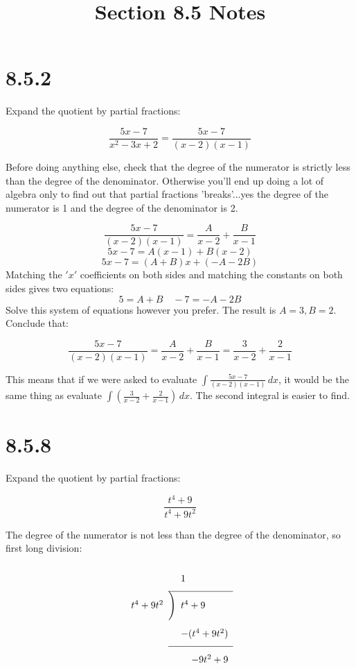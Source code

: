 \documentclass[11pt]{article}
\title{Section 8.5 Notes}
\begin{document}
\maketitle

\section*{8.5.2}

Expand the quotient by partial fractions:

$$\frac{5x-7}{x^2-3x+2} = \frac{5x-7}{(x-2)(x-1)}$$

Before doing anything else, check that the degree of the numerator is strictly less than the degree of the denominator. Otherwise you'll end up doing a lot of algebra only to find out that partial fractions 'breaks'...yes the degree of the numerator is 1 and the degree of the denominator is 2. 


$$\frac{5x-7}{(x-2)(x-1)} = \frac{A}{x-2} + \frac{B}{x-1}$$
$$5x-7 = A(x-1) + B(x-2)$$
$$5x-7 = (A+B)x + (-A-2B)$$
Matching the $'x'$ coefficients on both sides and matching the constants on both sides gives two equations:
$$5 = A+B \quad -7 = -A-2B$$
Solve this system of equations however you prefer. The result is 
$A = 3, B= 2$. Conclude that:

$$\frac{5x-7}{(x-2)(x-1)} = \frac{A}{x-2} + \frac{B}{x-1} = \frac{3}{x-2} + \frac{2}{x-1}$$

This means that if we were asked to evaluate $\int \frac{5x-7}{(x-2)(x-1)} \, dx$, it would be the same thing as evaluate $\int (\frac{3}{x-2} + \frac{2}{x-1}) \, dx$. The second integral is easier to find. 

\section*{8.5.8}

Expand the quotient by partial fractions:

$$\frac{t^4+9}{t^4+9t^2}$$

The degree of the numerator is not less than the degree of the denominator, so first long division:


\begin{align*}                                                                      
  \renewcommand\arraystretch{2}                                                     
  \begin{array}{r@{\hskip\arraycolsep}c@{\hskip\arraycolsep}l*2r}                   
    &&1\\[.1cm]                                                                      
    \cline{2-3}                                                                     
    t^4+9t^2 &\Bigg)&t^4+9\\[.1cm]                     
    &&-(t^4+9t^2)\\[.1cm]                           
    \cline{2-3}                                                                     
    &&\hfill-9t^2+9\\[.1cm]                                                         
  \end{array}                                                                       
\end{align*}
\end{document}
